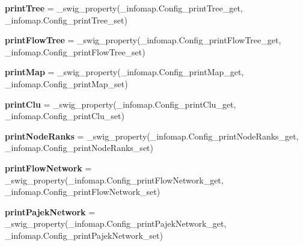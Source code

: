 \begin{DoxyCompactItemize}
\item 
\mbox{\label{classdsmacc_1_1graph_1_1infomap_1_1Config_a3e229d758a10706f895bd77097752039}} 
{\bfseries print\+Tree} = \+\_\+swig\+\_\+property(\+\_\+infomap.\+Config\+\_\+print\+Tree\+\_\+get, \+\_\+infomap.\+Config\+\_\+print\+Tree\+\_\+set)
\item 
\mbox{\label{classdsmacc_1_1graph_1_1infomap_1_1Config_a17a7c6fc6c5a5bd6f73a276626305a06}} 
{\bfseries print\+Flow\+Tree} = \+\_\+swig\+\_\+property(\+\_\+infomap.\+Config\+\_\+print\+Flow\+Tree\+\_\+get, \+\_\+infomap.\+Config\+\_\+print\+Flow\+Tree\+\_\+set)
\item 
\mbox{\label{classdsmacc_1_1graph_1_1infomap_1_1Config_ae2fb5f1b2b837c16b612fc21f4627f82}} 
{\bfseries print\+Map} = \+\_\+swig\+\_\+property(\+\_\+infomap.\+Config\+\_\+print\+Map\+\_\+get, \+\_\+infomap.\+Config\+\_\+print\+Map\+\_\+set)
\item 
\mbox{\label{classdsmacc_1_1graph_1_1infomap_1_1Config_ab7781ca365a5529520bdb6c2906440fe}} 
{\bfseries print\+Clu} = \+\_\+swig\+\_\+property(\+\_\+infomap.\+Config\+\_\+print\+Clu\+\_\+get, \+\_\+infomap.\+Config\+\_\+print\+Clu\+\_\+set)
\item 
\mbox{\label{classdsmacc_1_1graph_1_1infomap_1_1Config_ac56ae4888dff744b7dbca8b45462ade5}} 
{\bfseries print\+Node\+Ranks} = \+\_\+swig\+\_\+property(\+\_\+infomap.\+Config\+\_\+print\+Node\+Ranks\+\_\+get, \+\_\+infomap.\+Config\+\_\+print\+Node\+Ranks\+\_\+set)
\item 
\mbox{\label{classdsmacc_1_1graph_1_1infomap_1_1Config_adc3641fa8d3dea1b8b8a66531fa496ab}} 
{\bfseries print\+Flow\+Network} = \+\_\+swig\+\_\+property(\+\_\+infomap.\+Config\+\_\+print\+Flow\+Network\+\_\+get, \+\_\+infomap.\+Config\+\_\+print\+Flow\+Network\+\_\+set)
\item 
\mbox{\label{classdsmacc_1_1graph_1_1infomap_1_1Config_a1a6a78f9c308f4beaf1dcfd52bca74b7}} 
{\bfseries print\+Pajek\+Network} = \+\_\+swig\+\_\+property(\+\_\+infomap.\+Config\+\_\+print\+Pajek\+Network\+\_\+get, \+\_\+infomap.\+Config\+\_\+print\+Pajek\+Network\+\_\+set)

\end{DoxyCompactItemize}
